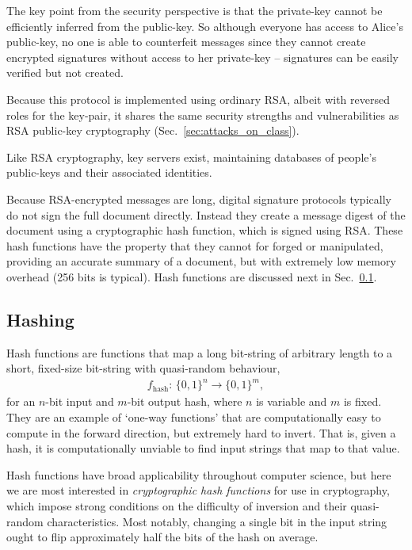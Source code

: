 The key point from the security perspective is that the private-key cannot be efficiently inferred from the public-key. So although everyone has access to Alice's public-key, no one is able to counterfeit messages since they cannot create encrypted signatures without access to her private-key -- signatures can be easily verified but not created.

Because this protocol is implemented using ordinary RSA, albeit with reversed roles for the key-pair, it shares the same security strengths and vulnerabilities as RSA public-key cryptography (Sec.~\ref{sec:attacks_on_class}).

Like RSA cryptography, key servers exist, maintaining databases of people's public-keys and their associated identities.

Because RSA-encrypted messages are long, digital signature protocols typically do not sign the full document directly. Instead they create a message digest of the document using a cryptographic hash function, which is signed using RSA. These hash functions have the property that they cannot for forged or manipulated, providing an accurate summary of a document, but with extremely low memory overhead (256 bits is typical). Hash functions are discussed next in Sec.~\ref{sec:hashing}.

%
%

\subsection{Hashing} \label{sec:hashing} 

Hash functions are functions that map a long bit-string of arbitrary length to a short, fixed-size bit-string with quasi-random behaviour,
\begin{align}
	f_\mathrm{hash}:\,\{0,1\}^n \to \{0,1\}^m,
\end{align}
for an $n$-bit input and $m$-bit output hash, where $n$ is variable and $m$ is fixed. They are an example of `one-way functions' that are computationally easy to compute in the forward direction, but extremely hard to invert. That is, given a hash, it is computationally unviable to find input strings that map to that value.

Hash functions have broad applicability throughout computer science, but here we are most interested in \textit{cryptographic hash functions} for use in cryptography, which impose strong conditions on the difficulty of inversion and their quasi-random characteristics. Most notably, changing a single bit in the input string ought to flip approximately half the bits of the hash on average.

